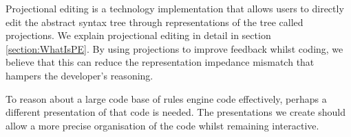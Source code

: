 Projectional editing is a technology implementation that allows users to directly edit the abstract syntax tree through representations of the tree called projections.
We explain projectional editing in detail in section \ref{section:WhatIsPE}.
By using projections to improve feedback whilst coding, we believe that this can reduce the representation impedance mismatch that hampers the developer's reasoning.

To reason about a large code base of rules engine code effectively, perhaps a different presentation of that code is needed.
The presentations we create should allow a more precise organisation of the code whilst remaining interactive.



